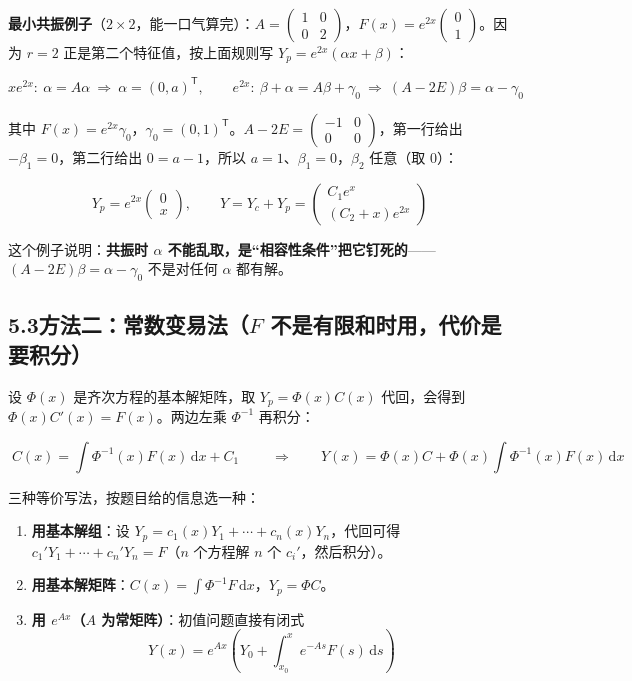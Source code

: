 \documentclass[11pt]{ctexart}
\newcommand{\dd}{\,\mathrm{d}}
\begin{document}
\textbf{最小共振例子}（$2\times2$，能一口气算完）：$A=\begin{pmatrix}1&0\\0&2\end{pmatrix}$，$F(x)=e^{2x}\begin{pmatrix}0\\1\end{pmatrix}$。因为 $r=2$ 正是第二个特征值，按上面规则写 $Y_p=e^{2x}(\alpha x+\beta)$：

\[
xe^{2x}:\ \alpha=A\alpha\ \Longrightarrow\ \alpha=(0,a)^{\mathsf T},
\qquad
e^{2x}:\ \beta+\alpha=A\beta+\gamma_0\ \Longrightarrow\ (A-2E)\beta=\alpha-\gamma_0
\]

其中 $F(x)=e^{2x}\gamma_0$，$\gamma_0=(0,1)^{\mathsf T}$。$A-2E=\begin{pmatrix}-1&0\\0&0\end{pmatrix}$，第一行给出 $-\beta_1=0$，第二行给出 $0=a-1$，所以 $a=1$、$\beta_1=0$，$\beta_2$ 任意（取 $0$）：

\[
Y_p=e^{2x}\begin{pmatrix}0\\x\end{pmatrix},\qquad
Y=Y_c+Y_p=\begin{pmatrix}C_1e^{x}\\ (C_2+x)e^{2x}\end{pmatrix}
\]

这个例子说明：\textbf{共振时 $\alpha$ 不能乱取，是“相容性条件”把它钉死的}——$(A-2E)\beta=\alpha-\gamma_0$ 不是对任何 $\alpha$ 都有解。

\subsection*{5.3\quad 方法二：常数变易法（$F$ 不是有限和时用，代价是要积分）}

设 $\Phi(x)$ 是齐次方程的基本解矩阵，取 $Y_p=\Phi(x)C(x)$ 代回，会得到 $\Phi(x)C'(x)=F(x)$。两边左乘 $\Phi^{-1}$ 再积分：

\[
\boxed{\;C(x)=\int\Phi^{-1}(x)F(x)\dd x+C_1\;}\qquad\Longrightarrow\qquad
Y(x)=\Phi(x)C+\Phi(x)\int\Phi^{-1}(x)F(x)\dd x
\]

三种等价写法，按题目给的信息选一种：

\begin{enumerate}[label=(\arabic*)]
\item \textbf{用基本解组}：设 $Y_p=c_1(x)Y_1+\cdots+c_n(x)Y_n$，代回可得 $c_1'Y_1+\cdots+c_n'Y_n=F$（$n$ 个方程解 $n$ 个 $c_i'$，然后积分）。
\item \textbf{用基本解矩阵}：$C(x)=\int\Phi^{-1}F\dd x$，$Y_p=\Phi C$。
\item \textbf{用 $e^{Ax}$（$A$ 为常矩阵）}：初值问题直接有闭式
\[
Y(x)=e^{Ax}\left(Y_0+\int_{x_0}^{x}e^{-As}F(s)\dd s\right)
\]
\end{enumerate}
\end{document}

